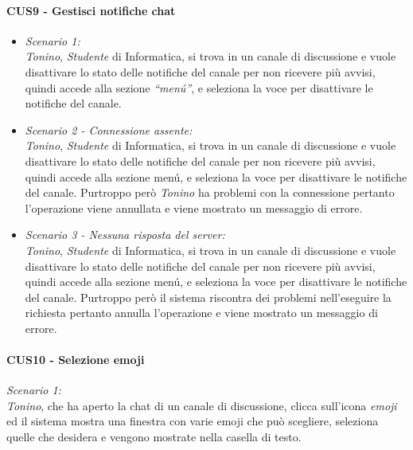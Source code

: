 \paragraph{CUS9 - Gestisci notifiche chat\\}
\begin{itemize}
\item \textit{Scenario 1:\\}
\textit{Tonino}, \textit{Studente} di Informatica, si trova in un canale di discussione e vuole disattivare lo stato delle notifiche del canale per non ricevere più avvisi, quindi accede alla sezione \textit{“menú”}, e seleziona la voce per disattivare le notifiche del canale.\\

\item \textit{Scenario 2 - Connessione assente:\\}
\textit{Tonino}, \textit{Studente} di Informatica, si trova in un canale di discussione e vuole disattivare lo stato delle notifiche del canale per non ricevere più avvisi, quindi accede alla sezione menú, e seleziona la voce per disattivare le notifiche del canale. Purtroppo però \textit{Tonino} ha problemi con la connessione pertanto l’operazione viene annullata e viene mostrato un messaggio di errore.\\

\item \textit{Scenario 3 - Nessuna risposta del server:\\}
\textit{Tonino}, \textit{Studente} di Informatica, si trova in un canale di discussione e vuole disattivare lo stato delle notifiche del canale per non ricevere più avvisi, quindi accede alla sezione menú, e seleziona la voce per disattivare le notifiche del canale. Purtroppo però il sistema riscontra dei problemi nell’eseguire la richiesta pertanto annulla l’operazione e viene mostrato un messaggio di errore.\\

\end{itemize}


\paragraph{CUS10 - Selezione emoji\\}

 \textit{Scenario 1:\\}
\textit{Tonino}, che ha aperto la chat di un canale di discussione, clicca sull’icona \textit{emoji} ed il sistema mostra una finestra con varie emoji che può scegliere, seleziona quelle che desidera e vengono mostrate nella casella di testo.

